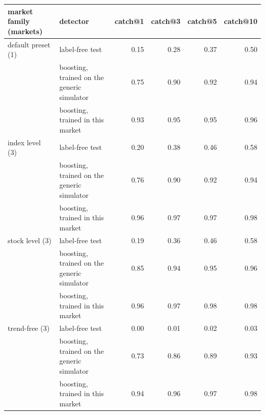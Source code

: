 \begin{tabular}{llrrrr}
\toprule
market family (markets) & detector & catch@1 & catch@3 & catch@5 & catch@10 \\
\midrule
default preset (1) & label-free test & 0.15 & 0.28 & 0.37 & 0.50 \\
 & boosting, trained on the generic simulator & 0.75 & 0.90 & 0.92 & 0.94 \\
 & boosting, trained in this market & 0.93 & 0.95 & 0.95 & 0.96 \\
\addlinespace
index level (3) & label-free test & 0.20 & 0.38 & 0.46 & 0.58 \\
 & boosting, trained on the generic simulator & 0.76 & 0.90 & 0.92 & 0.94 \\
 & boosting, trained in this market & 0.96 & 0.97 & 0.97 & 0.98 \\
\addlinespace
stock level (3) & label-free test & 0.19 & 0.36 & 0.46 & 0.58 \\
 & boosting, trained on the generic simulator & 0.85 & 0.94 & 0.95 & 0.96 \\
 & boosting, trained in this market & 0.96 & 0.97 & 0.98 & 0.98 \\
\addlinespace
trend-free (3) & label-free test & 0.00 & 0.01 & 0.02 & 0.03 \\
 & boosting, trained on the generic simulator & 0.73 & 0.86 & 0.89 & 0.93 \\
 & boosting, trained in this market & 0.94 & 0.96 & 0.97 & 0.98 \\
\bottomrule
\end{tabular}
